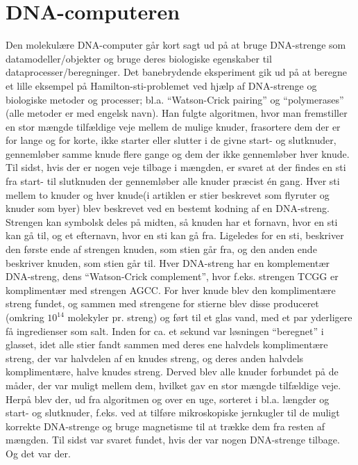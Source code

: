 \documentclass[10pt,a4paper]{article}
\begin{document}
\section{DNA-computeren}
Den molekulære DNA-computer går kort sagt ud på at bruge DNA-strenge som 
datamodeller/objekter og bruge deres biologiske egenskaber til 
dataprocesser/beregninger.
Det banebrydende eksperiment gik ud på at beregne et lille eksempel på 
Hamilton-sti-problemet ved hjælp af DNA-strenge og biologiske metoder og 
processer; bl.a. ``Watson-Crick pairing'' og ``polymerases'' (alle metoder er
med engelsk navn). Han fulgte algoritmen, hvor man fremstiller en stor mængde
tilfældige veje mellem de mulige knuder, frasortere dem der er for lange og for
korte, ikke starter eller slutter i de givne start- og slutknuder, gennemløber
samme knude flere gange og dem der ikke gennemløber hver knude. Til sidst, hvis
der er nogen veje tilbage i mængden, er svaret at der findes en sti fra start-
til slutknuden der gennemløber alle knuder præcist én gang.
Hver sti mellem to knuder og hver knude(i artiklen er stier beskrevet som flyruter og knuder 
som byer) blev beskrevet ved en bestemt kodning af en DNA-streng. 
Strengen kan symbolsk deles på midten, så knuden har et fornavn, hvor en sti kan
gå til, og et efternavn, hvor en sti kan gå fra. Ligeledes for en sti, beskriver
den første ende af strengen knuden, som stien går fra, og den anden ende
beskriver knuden, som stien går til. Hver DNA-streng har en komplementær
DNA-streng, dens ``Watson-Crick complement'', hvor f.eks. strengen TCGG er
komplimentær med strengen AGCC. For hver knude blev den komplimentære streng
fundet, og sammen med strengene for stierne blev disse produceret (omkring
$10^{14}$ molekyler pr. streng) og ført til et glas vand, med et par yderligere
få ingredienser som salt. Inden for ca. et sekund var løsningen ``beregnet'' i
glasset, idet alle stier fandt sammen med deres ene halvdels komplimentære
streng, der var halvdelen af en knudes streng, og deres anden halvdels
komplimentære, halve knudes streng. Derved blev alle knuder forbundet på de
måder, der var muligt mellem dem, hvilket gav en stor mængde tilfældige veje.
Herpå blev der, ud fra algoritmen og over en uge, sorteret i bl.a. længder og
start- og slutknuder, f.eks. ved at tilføre mikroskopiske jernkugler til de
muligt korrekte DNA-strenge og bruge magnetisme til at trække dem fra resten af
mængden. Til sidst var svaret fundet, hvis der var nogen DNA-strenge tilbage. Og
det var der.
\end{document}
